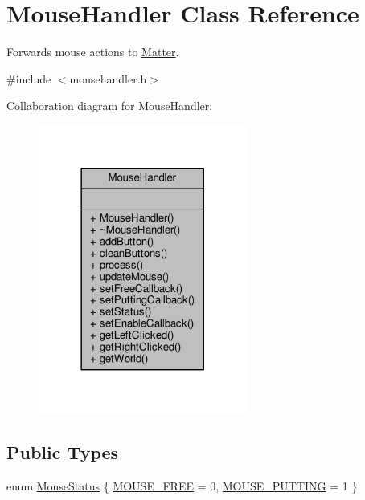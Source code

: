 \hypertarget{classMouseHandler}{}\section{Mouse\+Handler Class Reference}
\label{classMouseHandler}


Forwards mouse actions to \hyperlink{classMatter}{Matter}.  




{\ttfamily \#include $<$mousehandler.\+h$>$}



Collaboration diagram for Mouse\+Handler\+:\nopagebreak
\begin{figure}[H]
\begin{center}
\leavevmode
\includegraphics[width=194pt]{classMouseHandler__coll__graph}
\end{center}
\end{figure}
\subsection*{Public Types}
\begin{DoxyCompactItemize}
\item 
enum \hyperlink{classMouseHandler_af967315727aa1d435d55cc704e64fd1a}{Mouse\+Status} \{ \hyperlink{classMouseHandler_af967315727aa1d435d55cc704e64fd1aa5aba71e1304fdbe0f2899b6b1345d74a}{M\+O\+U\+S\+E\+\_\+\+F\+R\+E\+E} = 0, 
\hyperlink{classMouseHandler_af967315727aa1d435d55cc704e64fd1aa440928d86f44f388601ede4e6b91df76}{M\+O\+U\+S\+E\+\_\+\+P\+U\+T\+T\+I\+N\+G} = 1
 \}
\end{DoxyCompactItemize}
